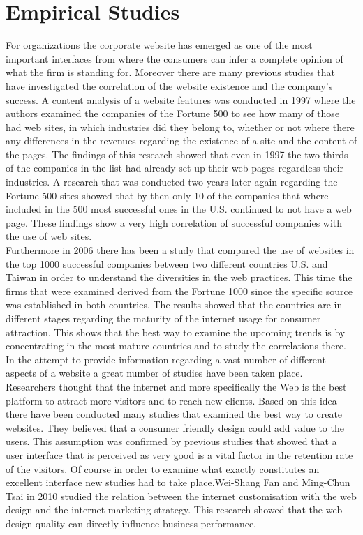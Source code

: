 \documentclass{book}
\begin{document}
\section{Empirical Studies}
For organizations the corporate website has emerged as one of the most important interfaces from where the consumers can infer a complete opinion of what the firm is standing for. Moreover there are many previous studies that have investigated the correlation of the website existence and the company's success. A content analysis of a website features was conducted in 1997\cite{key7} where the authors examined the companies of the Fortune 500 to see how many of those had web sites, in which industries did they belong to, whether or not where there any differences in the revenues regarding the existence of a site and the content of the pages. The findings of this research showed that even in 1997 the two thirds of the companies in the list had already set up their web pages regardless their industries. A research that was conducted two years later\cite{key10} again regarding the Fortune 500 sites showed that by then only 10 of the companies that where included in the 500 most successful ones in the U.S. continued to not have a web page. These findings show a very high correlation of successful companies with the use of web sites.\\
Furthermore in 2006 there has been a study that compared the use of websites in the top 1000 successful companies between two different countries\cite{key2} U.S. and Taiwan in order to understand the diversities in the web practices. This time the firms that were examined derived from the Fortune 1000 since the specific source was established in both countries. The results showed that the countries are in different stages regarding the maturity of the internet usage for consumer attraction. This shows that the best way to examine the upcoming trends is by concentrating in the most mature countries and to study the correlations there.\\
In the attempt to provide information regarding a vast number of different aspects of a website a great number of studies have been taken place.\\
Researchers thought that the internet and more specifically the Web is the best platform to attract more visitors and to reach new clients.\cite{key4} Based on this idea there have been conducted many studies that examined the best way to create websites. They believed that a consumer friendly design could add value to the users. This assumption was confirmed by previous studies that showed that a user interface that is perceived as very good is a vital factor in the retention rate of the visitors.\cite{key6} Of course in order to examine what exactly constitutes an excellent interface new studies had to take place.Wei-Shang Fan and Ming-Chun Tsai\cite{key5} in 2010 studied the relation between the internet customisation with the web design and the internet marketing strategy. This research showed that the web design quality can directly influence business performance.\\
\end{document}
